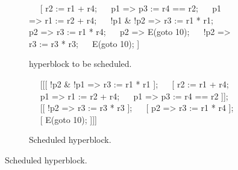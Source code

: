 \begin{figure*}
  \centering
  \begin{subfigure}{\linewidth}
    \begin{subfigure}[b]{0.48\linewidth}
\begin{rtllisting}
~\sI{}~ [              r2 := r1 + r4;
~\sVI{}~   p1 =>        p3 := r4 == r2;
~\sII{}~   p1 =>        r1 := r2 + r4;
~\sIII{}~   !p1 & !p2 => r3 := r1 * r1;
~\sIV{}~   p2 =>        r3 := r1 * r4;
~\sVIIa{}~   p2 =>        E(goto 10);
~\sV{}~   !p2 =>       r3 := r3 * r3;
~\sVII{}~                E(goto 10);  ]
\end{rtllisting}
      \caption{\rtlblock{} hyperblock to be scheduled.}%
      \label{fig:op_chain_a}
    \end{subfigure}\hfill%
    \begin{subfigure}[b]{0.48\linewidth}
\begin{rtllisting}
~\sIII{}~ [[[ !p2 & !p1 => r3 := r1 * r1 ];
~\sI{}~   [              r2 := r1 + r4;
~\sII{}~      p1       => r1 := r2 + r4;
~\sVI{}~      p1       => p3 := r4 == r2 ]];
~\sV{}~  [[ !p2       => r3 := r3 * r3 ];
~\sIV{}~   [  p2       => r3 := r1 * r4 ];
~\sVII{}~   [              E(goto 10); ]]]
\end{rtllisting}
      \caption{Scheduled \rtlpar{} hyperblock.}%
      \label{fig:op_chain_c}
    \end{subfigure}
  \end{subfigure}\vspace{2em}
  \begin{subfigure}{\linewidth}
    \begin{subfigure}[b]{0.3\linewidth}
      \centering
\end{subfigure}
\end{subfigure}
\end{figure*}

